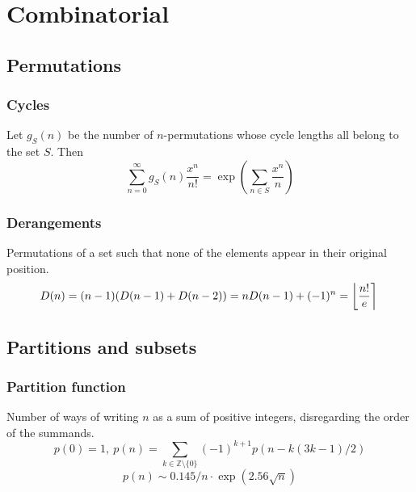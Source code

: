\chapter{Combinatorial}

\section{Permutations}

	\subsection{Cycles}
		Let $g_S(n)$ be the number of $n$-permutations whose cycle lengths all belong to the set $S$. Then
		$$\sum_{n=0} ^\infty g_S(n) \frac{x^n}{n!} = \exp\left(\sum_{n\in S} \frac{x^n} {n} \right)$$

	\subsection{Derangements}
		Permutations of a set such that none of the elements appear in their original position.
		\[ \mkern-2mu D(n) = (n-1)(D(n-1)+D(n-2)) = n D(n-1)+(-1)^n = \left\lfloor\frac{n!}{e}\right\rceil \]



\section{Partitions and subsets}
	\subsection{Partition function}
		Number of ways of writing $n$ as a sum of positive integers, disregarding the order of the summands.
		\[ p(0) = 1,\ p(n) = \sum_{k \in \mathbb Z \setminus \{0\}}{(-1)^{k+1} p(n - k(3k-1) / 2)} \]
		\[ p(n) \sim 0.145 / n \cdot \exp(2.56 \sqrt{n}) \]

